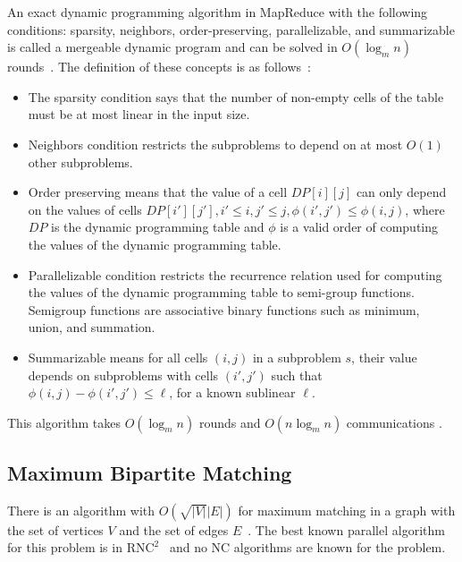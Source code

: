 \documentclass[preprint,12pt]{elsarticle}
\newcommand{\size}[1]{\lvert #1 \rvert}
\begin{document}
An exact dynamic programming algorithm in MapReduce with the following conditions: sparsity, neighbors, order-preserving, parallelizable, and summarizable is called a mergeable dynamic program and can be solved in $O(\log_m n)$ rounds~\cite{aghamolaei2018geometric}. The definition of these concepts is as follows~\cite{aghamolaei2018geometric}:
\begin{itemize}
\item The sparsity condition says that the number of non-empty cells of the table must be at most linear in the input size.
\item Neighbors condition restricts the subproblems to depend on at most $O(1)$ other subproblems.
\item Order preserving means that the value of a cell $DP[i][j]$ can only depend on the values of cells $DP[i'][j'], i'\leq i, j'\leq j, \phi(i',j') \leq \phi(i,j)$, where $DP$ is the dynamic programming table and $\phi$ is a valid order of computing the values of the dynamic programming table.
\item Parallelizable condition restricts the recurrence relation used for computing the values of the dynamic programming table to semi-group functions. Semigroup functions are associative binary functions such as minimum, union, and summation.
\item Summarizable means for all cells $(i,j)$ in a subproblem $s$, their value depends on subproblems with cells $(i',j')$ such that $\phi(i,j)-\phi(i',j') \leq \ell$, for a known sublinear $\ell$.
\end{itemize}
This algorithm takes $O(\log_m n)$ rounds and $O(n\log_m n)$ communications \cite{aghamolaei2018geometric}.

\subsection{Maximum Bipartite Matching}
There is an algorithm with $O(\sqrt{\size{V}}\size{E})$ for maximum matching in a graph with the set of vertices $V$ and the set of edges $E$~\cite{cormen2022introduction}. The best known parallel algorithm for this problem is in $\mathrm{RNC}^2$~\cite{mulmuley1987matching,karp1985constructing} and no $\mathrm{NC}$ algorithms are known for the problem.
\end{document}
